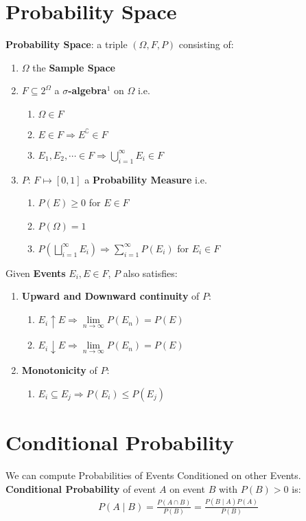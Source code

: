 \documentclass[a4paper,portrait,columns=2, hidelinks]{cheatsheet}
\begin{document}
\section{Probability Space}
\textbf{Probability Space}: a triple \( (\Omega, F, P)\) consisting of:
\begin{enumerate}
	\item \( \Omega \) the \textbf{Sample Space}
	\item \( F \subseteq 2^{\Omega}\) a \textbf{\(\sigma\)-algebra}\hyperref[sec:ft1]{$^1$} on \(\Omega\)  i.e.
	\begin{enumerate}
		\item \(\Omega \in F\)
		\item \(E \in F \Rightarrow E^{\complement} \in F\)
		\item \(E_1, E_2, \cdots \in F \Rightarrow\bigcup_{i=1}^{\infty} E_i \in F\)
	\end{enumerate}
	\item \(P\): \(F \mapsto [0,1] \) a \textbf{Probability Measure} i.e.
	\begin{enumerate}
		\item \(P(E) \ge 0\) for \(E \in F\)
		\item \(P(\Omega) = 1\)
		\item \(P \left(\bigsqcup_{i=1}^{\infty} E_i \right)\Rightarrow\sum_{i=1}^{\infty} P(E_i)\) for \(E_i \in F\)
	\end{enumerate}
\end{enumerate}

Given \textbf{Events} \(E_i, E \in F\), $P$ also satisfies:
\begin{enumerate}
\item \textbf{Upward and Downward continuity} of \(P\):
	\begin{enumerate}
	\item \(E_i \uparrow E \Rightarrow \lim\limits_{n\to\infty} P(E_n) = P(E) \)
	\item \(E_i \downarrow E \Rightarrow \lim\limits_{n\to\infty} P(E_n) = P(E) \)
	\end{enumerate}
\item \textbf{Monotonicity} of \(P\):
        \begin{enumerate}
        	\item \( E_i \subseteq E_j \Rightarrow P(E_i) \le P(E_j)\)
        \end{enumerate}
\end{enumerate}

\section{Conditional Probability}
We can compute Probabilities of Events Conditioned on other Events. \\
\textbf{Conditional Probability} of event \(A\) on event \(B\) with \(P(B) > 0\) is:
\begin{align*}
P(A \mid B) = \frac{P(A \cap B)}{P(B)} = \frac{P(B \mid A)P(A)}{P(B)}
\end{align*}
\end{document}

